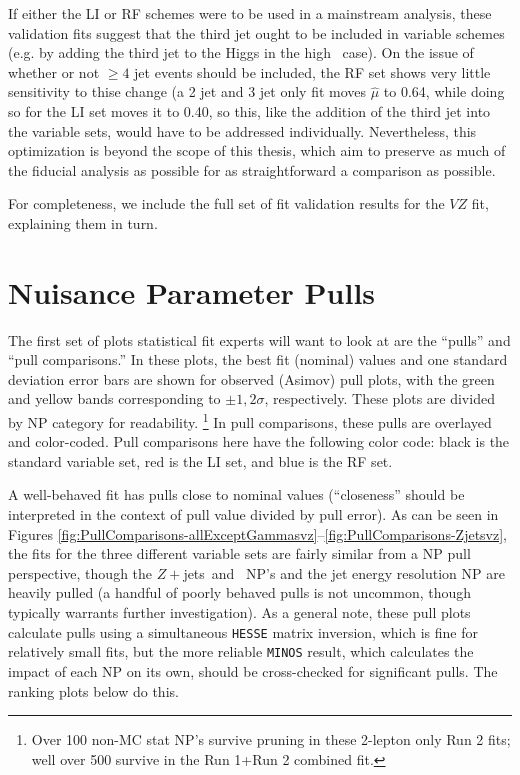 \begin{enumeate}
If either the LI or RF schemes were to be used in a mainstream analysis, these validation fits suggest that the third jet ought to be included in variable schemes (e.g. by adding the third jet to the Higgs in the high \ptv\, case).  On the issue of whether or not $\ge4$ jet events should be included, the RF set shows very little sensitivity to thise change (a 2 jet and 3 jet only fit moves $\hat{\mu}$ to 0.64, while doing so for the LI set moves it to 0.40, so this, like the addition of the third jet into the variable sets, would have to be addressed individually.  Nevertheless, this optimization is beyond the scope of this thesis, which aim to preserve as much of the fiducial analysis as possible for as straightforward a comparison as possible.  

  For completeness, we include the full set of fit validation results for the $VZ$ fit, explaining them in turn.  

\section{Nuisance Parameter Pulls}
The first set of plots statistical fit experts will want to look at are the ``pulls'' and ``pull comparisons.''  In these plots, the best fit (nominal) values and one standard deviation error bars are shown for observed (Asimov) pull plots, with the green and yellow bands corresponding to $\pm1,2\sigma$, respectively.  These plots are divided by NP category for readability.  \footnote{Over 100 non-MC stat NP's survive pruning in these 2-lepton only Run 2 fits; well over 500 survive in the Run 1+Run 2 combined fit.}  In pull comparisons, these pulls are overlayed and color-coded.  Pull comparisons here have the following color code: black is the standard variable set, red is the LI set, and blue is the RF set.  

A well-behaved fit has pulls close to nominal values (``closeness'' should be interpreted in the context of pull value divided by pull error).  As can be seen in Figures \ref{fig:PullComparisons-allExceptGammasvz}--\ref{fig:PullComparisons-Zjetsvz}, the fits for the three different variable sets are fairly similar from a NP pull perspective, though the $Z+$jets \mbb\,and \ptv\, NP's and the jet energy resolution NP are heavily pulled (a handful of poorly behaved pulls is not uncommon, though typically warrants further investigation).  As a general note, these pull plots calculate pulls using a simultaneous \texttt{HESSE} matrix inversion, which is fine for relatively small fits, but the more reliable \texttt{MINOS} result, which calculates the impact of each NP on its own, should be cross-checked for significant pulls.  The ranking plots below do this.


\end{enumeate}
